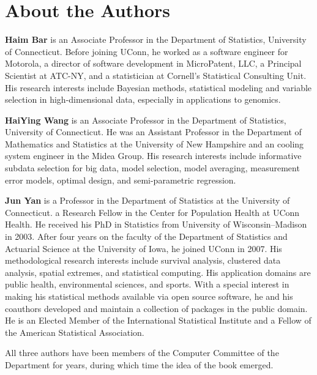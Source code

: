 \newpage\null\thispagestyle{empty}\newpage

\null\vskip1.175in
\thispagestyle{empty}
\section*{About the Authors}
\textbf{Haim Bar} is an Associate Professor in the Department of Statistics,
University of Connecticut. Before joining UConn, he worked as a software
engineer for Motorola, a director of software development in MicroPatent, LLC, a
Principal Scientist at ATC-NY, and a statistician at Cornell's Statistical
Consulting Unit.
His research interests include Bayesian methods, statistical modeling and variable 
selection in high-dimensional data, especially in applications to genomics.


\noindent\textbf{HaiYing Wang} is an Associate Professor in the Department of
Statistics, University of Connecticut. He was an Assistant Professor in the
Department of Mathematics and Statistics at the University of New Hampshire and
an cooling system engineer in the Midea Group. His research interests include
informative subdata selection for big data, model selection, model averaging,
measurement error models, optimal design, and semi-parametric regression.

\noindent\textbf{Jun Yan} is a Professor in the Department of Statistics at the
University of Connecticut. a Research Fellow in the Center for Population Health
at UConn Health. He received his PhD in Statistics from University of
Wisconsin--Madison in 2003. After four years on the faculty of the Department of
Statistics and Actuarial Science at the University of Iowa, he joined
UConn in 2007. His methodological research interests include
survival analysis, clustered data analysis, spatial extremes, and statistical
computing. His application domains are public health, environmental sciences,
and sports. With a special interest in making his statistical methods available
via open source software, he and his coauthors developed and maintain a
collection of \R packages in the public domain. He
is an Elected Member of the International Statistical Institute and a Fellow of
the American Statistical Association.


All three authors have been members of the Computer Committee of the Department
for years, during which time the idea of the book emerged.




